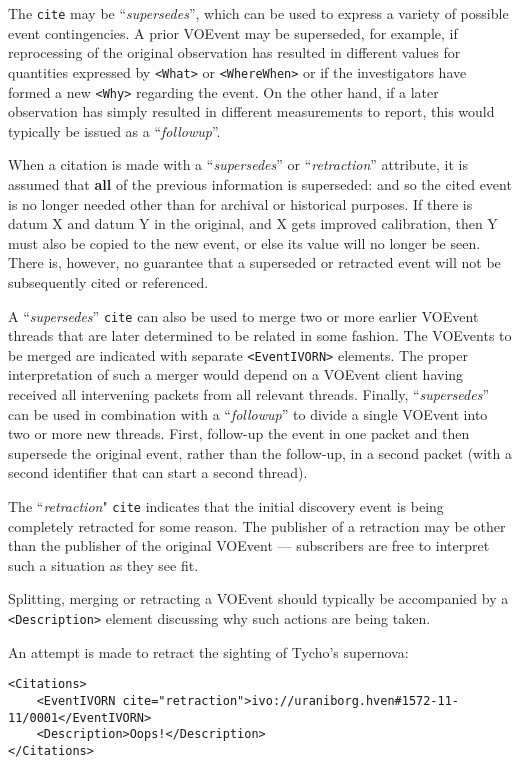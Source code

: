 \documentclass[11pt,a4paper]{ivoa}
\begin{document}
The {\tt cite} may be ``\emph{supersedes}'', which can be used to express a
variety of possible event contingencies. A prior VOEvent may be superseded, for
example, if reprocessing of the original observation has resulted in different
values for quantities expressed by {\tt <What>} or {\tt <WhereWhen>} or if the
investigators have formed a new {\tt <Why>} regarding the event. On the other
hand, if a later observation has simply resulted in different measurements to
report, this would typically be issued as a ``\emph{followup}''.

When a citation is made with a ``\emph{supersedes}'' or ``\emph{retraction}''
attribute, it is assumed that {\bf all} of the previous information is
superseded: and so the cited event is no longer needed other than for archival
or historical purposes. If there is datum X and datum Y in the original, and X
gets improved calibration, then Y must also be copied to the new event, or else
its value will no longer be seen. There is, however, no guarantee that a
superseded or retracted event will not be subsequently cited or referenced.

A ``\emph{supersedes}'' {\tt cite} can also be used to merge two or more earlier
VOEvent threads that are later determined to be related in some fashion. The
VOEvents to be merged are indicated with separate {\tt <EventIVORN>} elements.
The proper interpretation of such a merger would depend on a VOEvent client
having received all intervening packets from all relevant threads. Finally,
``\emph{supersedes}'' can be used in combination with a ``\emph{followup}'' to
divide a single VOEvent into two or more new threads. First, follow-up the event
in one packet and then supersede the original event, rather than the follow-up,
in a second packet (with a second identifier that can start a second thread).

The ``\emph{retraction}" {\tt cite} indicates that the initial discovery event
is being completely retracted for some reason. The publisher of a retraction may
be other than the publisher of the original VOEvent --- subscribers are free to
interpret such a situation as they see fit.

Splitting, merging or retracting a VOEvent should typically be accompanied by a
{\tt <Description>} element discussing why such actions are being taken.

An attempt is made to retract the sighting of Tycho's supernova:
\begin{lstlisting}
<Citations>
    <EventIVORN cite="retraction">ivo://uraniborg.hven#1572-11-11/0001</EventIVORN>
    <Description>Oops!</Description>
</Citations>
\end{lstlisting}
\end{document}
